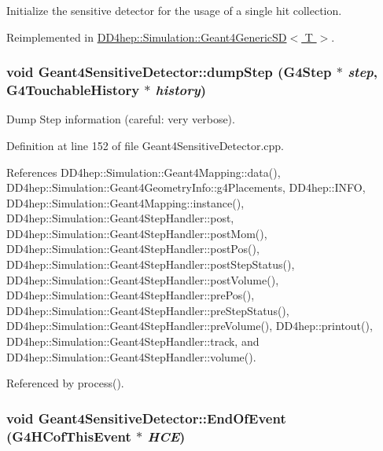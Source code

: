 Initialize the sensitive detector for the usage of a single hit collection. 

Reimplemented in \hyperlink{class_d_d4hep_1_1_simulation_1_1_geant4_generic_s_d_a3c70c7c1f1be8bd0e6364327e28228e4}{DD4hep::Simulation::Geant4GenericSD$<$ T $>$}.\hypertarget{class_d_d4hep_1_1_simulation_1_1_geant4_sensitive_detector_aa5dfd46956ecfddd3815e12be4436430}{
\subsubsection[{dumpStep}]{\setlength{\rightskip}{0pt plus 5cm}void Geant4SensitiveDetector::dumpStep (G4Step $\ast$ {\em step}, \/  G4TouchableHistory $\ast$ {\em history})}}
\label{class_d_d4hep_1_1_simulation_1_1_geant4_sensitive_detector_aa5dfd46956ecfddd3815e12be4436430}


Dump Step information (careful: very verbose). 

Definition at line 152 of file Geant4SensitiveDetector.cpp.

References DD4hep::Simulation::Geant4Mapping::data(), DD4hep::Simulation::Geant4GeometryInfo::g4Placements, DD4hep::INFO, DD4hep::Simulation::Geant4Mapping::instance(), DD4hep::Simulation::Geant4StepHandler::post, DD4hep::Simulation::Geant4StepHandler::postMom(), DD4hep::Simulation::Geant4StepHandler::postPos(), DD4hep::Simulation::Geant4StepHandler::postStepStatus(), DD4hep::Simulation::Geant4StepHandler::postVolume(), DD4hep::Simulation::Geant4StepHandler::prePos(), DD4hep::Simulation::Geant4StepHandler::preStepStatus(), DD4hep::Simulation::Geant4StepHandler::preVolume(), DD4hep::printout(), DD4hep::Simulation::Geant4StepHandler::track, and DD4hep::Simulation::Geant4StepHandler::volume().

Referenced by process().\hypertarget{class_d_d4hep_1_1_simulation_1_1_geant4_sensitive_detector_a1275a33abdbd4efb70ee1698eda3d2db}{
\subsubsection[{EndOfEvent}]{\setlength{\rightskip}{0pt plus 5cm}void Geant4SensitiveDetector::EndOfEvent (G4HCofThisEvent $\ast$ {\em HCE})}}
\label{class_d_d4hep_1_1_simulation_1_1_geant4_sensitive_detector_a1275a33abdbd4efb70ee1698eda3d2db}


